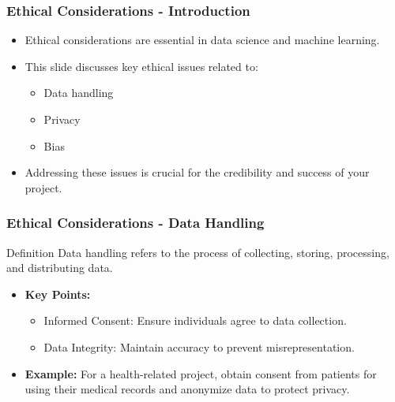 \documentclass[aspectratio=169]{beamer}
\begin{document}
\begin{frame}[fragile]
    \frametitle{Ethical Considerations - Introduction}
    \begin{itemize}
        \item Ethical considerations are essential in data science and machine learning.
        \item This slide discusses key ethical issues related to:
        \begin{itemize}
            \item Data handling
            \item Privacy
            \item Bias
        \end{itemize}
        \item Addressing these issues is crucial for the credibility and success of your project.
    \end{itemize}
\end{frame}

\begin{frame}[fragile]
    \frametitle{Ethical Considerations - Data Handling}
    \begin{block}{Definition}
        Data handling refers to the process of collecting, storing, processing, and distributing data.
    \end{block}
    \begin{itemize}
        \item \textbf{Key Points:}
        \begin{itemize}
            \item Informed Consent: Ensure individuals agree to data collection.
            \item Data Integrity: Maintain accuracy to prevent misrepresentation.
        \end{itemize}
        \item \textbf{Example:} For a health-related project, obtain consent from patients for using their medical records and anonymize data to protect privacy.
    \end{itemize}
\end{frame}
\end{document}
